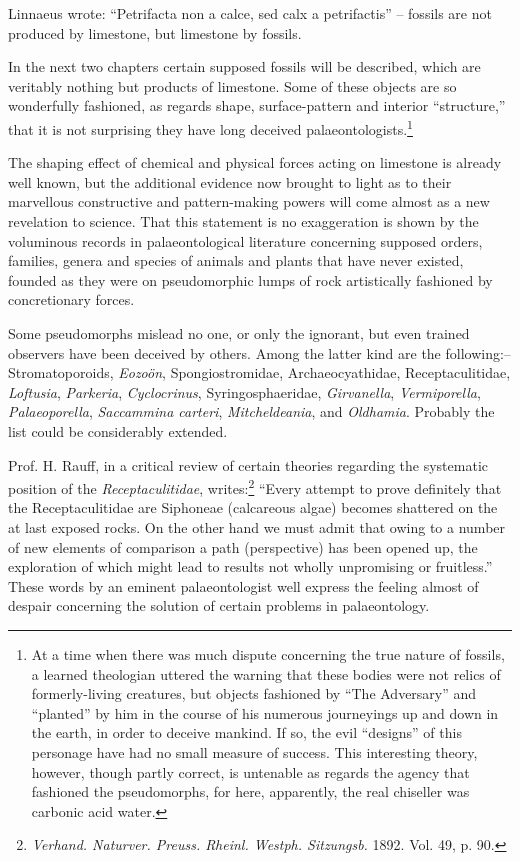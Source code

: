 \documentclass[a4paper, 12pt, oneside]{article}
\begin{document}
Linnaeus wrote: ``Petrifacta non a calce, sed calx a petrifactis'' -- fossils are not produced by limestone, but limestone by fossils.

In the next two chapters certain supposed fossils will be described, which are veritably nothing but products of limestone. Some of these objects are so wonderfully fashioned, as regards shape, surface-pattern and interior ``structure,'' that it is not surprising they have long deceived palaeontologists.\footnote{At a time when there was much dispute concerning the true nature of fossils, a learned theologian uttered the warning that these bodies were not relics of formerly-living creatures, but objects fashioned by ``The Adversary'' and ``planted'' by him in the course of his numerous journeyings up and down in the earth, in order to deceive mankind. If so, the evil ``designs'' of this personage have had no small measure of success. This interesting theory, however, though partly correct, is untenable as regards the agency that fashioned the pseudomorphs, for here, apparently, the real chiseller was carbonic acid water.}

The shaping effect of chemical and physical forces acting on limestone is already well known, but the additional evidence now brought to light as to their marvellous constructive and pattern-making powers will come almost as a new revelation to science. That this statement is no exaggeration is shown by the voluminous records in palaeontological literature concerning supposed orders, families, genera and species of animals and plants that have never existed, founded as they were on pseudomorphic lumps of rock artistically fashioned by concretionary forces.

Some pseudomorphs mislead no one, or only the ignorant, but even trained observers have been deceived by others. Among the latter kind are the following:-- Stromatoporoids, \emph{Eozoön}, Spongiostromidae, Archaeocyathidae, Receptaculitidae, \emph{Loftusia}, \emph{Parkeria}, \emph{Cyclocrinus}, Syringosphaeridae, \emph{Girvanella}, \emph{Vermiporella}, \emph{Palaeoporella}, \emph{Saccammina carteri}, \emph{Mitcheldeania}, and \emph{Oldhamia}. Probably the list could be considerably extended.

Prof. H. Rauff, in a critical review of certain theories regarding the systematic position of the \emph{Receptaculitidae}, writes:\footnote{\emph{Verhand. Naturver. Preuss. Rheinl. Westph. Sitzungsb.} 1892. Vol. 49, p. 90.} ``Every attempt to prove definitely that the Receptaculitidae are Siphoneae (calcareous algae) becomes shattered on the at last exposed rocks. On the other hand we must admit that owing to a number of new elements of comparison a path (perspective) has been opened up, the exploration of which might lead to results not wholly unpromising or fruitless.'' These words by an eminent palaeontologist well express the feeling almost of despair concerning the solution of certain problems in palaeontology.
\end{document}
